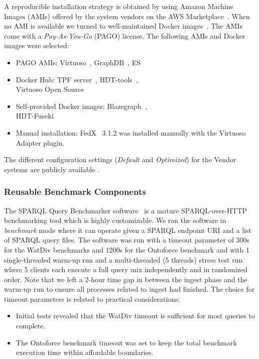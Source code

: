 A reproducible installation strategy is obtained by using Amazon Machine Images (AMIs) offered by the system vendors on the AWS Marketplace~\cite{awsmarketplace}. When no AMI is available we turned to well-maintained Docker images~\cite{dockerhub}.
The AMIs come with a \emph{Pay-As-You-Go} (PAGO) license.
The following AMIs and Docker images were selected:

\begin{itemize}
	\item PAGO AMIs: Virtuoso~\cite{Virtuoso}, GraphDB~\cite{graphdb}, ES
	\item Docker Hub: TPF server~\cite{dockerhubldfserver}, HDT-tools~\cite{hdtcpp}, \\ Virtuoso Open Source~\cite{virtuosoos} 
	\item Self-provided Docker images: Blazegraph~\cite{dockerblazegraph}, \\ HDT-Fuseki~\cite{hdtfuseki} 
	\item Manual installation: FedX~\cite{saleem2016fine} 3.1.2 was installed manually with the Virtuoso Adapter plugin. %
\end{itemize}

The different configuration settings (\emph{Default} and \emph{Optimized}) for the Vendor systems are publicly available .




\subsubsection{Reusable Benchmark Components}
The SPARQL Query Benchmarker software~\cite{sparqlquerybm} is a mature SPARQL-over-HTTP benchmarking tool which is highly customizable. We ran the software in \emph{benchmark} mode where it can operate given a SPARQL endpoint URI and a list of SPARQL query files. The software was run with a timeout parameter of 300s for the WatDiv benchmarks and 1200s for the Ontoforce benchmark and with 1 single-threaded warm-up run and a multi-threaded (5 threads) stress test run where 5 clients each execute a full query mix independently and in randomized order. Note that we left a 2-hour time gap in between the ingest phase and the warm-up run to ensure all processes related to ingest had finished.
The choice for timeout parameters is related to practical considerations: 
\begin{itemize}
	\item Initial tests revealed that the WatDiv timeout is sufficient for most queries to complete.
	\item The Ontoforce benchmark timeout was set to keep the total benchmark execution time within affordable boundaries.
\end{itemize} 

